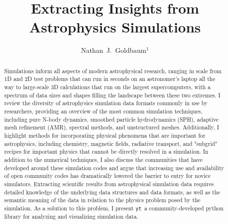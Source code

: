\documentclass[11pt,twoside]{article}
\newcommand{\yt}{\texttt{yt}}
\begin{document}
\title{Extracting Insights from Astrophysics Simulations}

\author{Nathan~J.~Goldbaum$^1$}



\begin{abstract}
Simulations inform all aspects of modern astrophysical research, ranging in scale from 1D and 2D test problems that can run in seconds on an astronomer's laptop all the way to large-scale 3D calculations that run on the largest supercomputers, with a spectrum of data sizes and shapes filling the landscape between these two extremes. I review the diversity of astrophysics simulation data formats commonly in use by researchers, providing an overview of the most common simulation techniques, including pure N-body dynamics, smoothed particle hydrodynamics (SPH), adaptive mesh refinement (AMR), spectral methods, and unstructured meshes. Additionally, I highlight methods for incorporating physical phenomena that are important for astrophysics, including chemistry, magnetic fields, radiative transport, and "subgrid" recipes for important physics that cannot be directly resolved in a simulation. In addition to the numerical techniques, I also discuss the communities that have developed around these simulation codes and argue that increasing use and availability of open community codes has dramatically lowered the barrier to entry for novice simulators. Extracting scientific results from astrophysical simulation data requires detailed knowledge of the underlying data structures and data formats, as well as the semantic meaning of the data in relation to the physics problem posed by the simulation. As a solution to this problem, I present \yt\, a community-developed python library for analyzing and visualizing simulation data.
\end{abstract}
\end{document}
